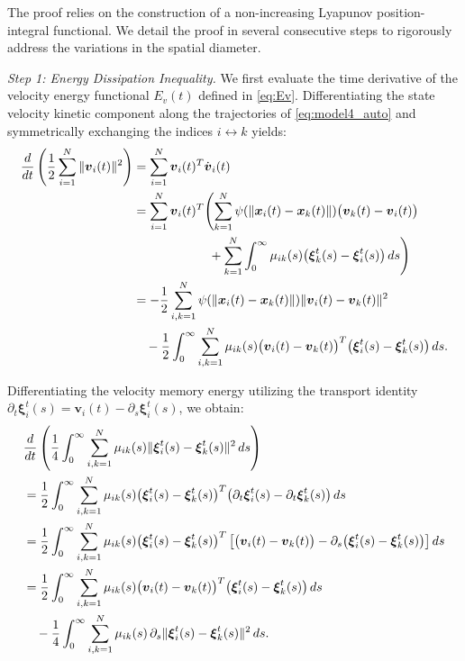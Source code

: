 \documentclass[11pt]{amsart}
\numberwithin{equation}{section}
\begin{document}
 The proof relies on the construction of a non-increasing Lyapunov position-integral functional. We detail the proof in several consecutive steps to rigorously address the variations in the spatial diameter.

\noindent\textit{Step 1: Energy Dissipation Inequality.}
We first evaluate the time derivative of the velocity energy functional $E_v(t)$ defined in \eqref{eq:Ev}. Differentiating the state velocity kinetic component along the trajectories of \eqref{eq:model4_auto} and symmetrically exchanging the indices $i \leftrightarrow k$ yields:
\begin{align}\label{eq:Ev_dot_state}
\frac{d}{dt}\left(\frac12\sum_{i=1}^N\|\boldsymbol{v}_i(t)\|^2\right) &= \sum_{i=1}^N \boldsymbol{v}_i(t)^T \dot{\boldsymbol{v}}_i(t) \notag \\
&= \sum_{i=1}^N \boldsymbol{v}_i(t)^T \Biggl( \sum_{k=1}^{N} \psi(\|\boldsymbol{x}_i(t)-\boldsymbol{x}_k(t)\|)\bigl(\boldsymbol{v}_k(t)-\boldsymbol{v}_i(t)\bigr) \notag \\
&\qquad\qquad\qquad + \sum_{k=1}^{N} \int_0^\infty \mu_{ik}(s)\bigl(\boldsymbol{\xi}_k^t(s)-\boldsymbol{\xi}_i^t(s)\bigr)\,ds \Biggr) \notag \\
&= -\frac12\sum_{i,k=1}^N\psi(\|\boldsymbol{x}_i(t)-\boldsymbol{x}_k(t)\|)\|\boldsymbol{v}_i(t)-\boldsymbol{v}_k(t)\|^2 \notag\\
&\quad -\frac12\int_0^\infty\sum_{i,k=1}^N\mu_{ik}(s)\bigl(\boldsymbol{v}_i(t)-\boldsymbol{v}_k(t)\bigr)^T\bigl(\boldsymbol{\xi}_i^t(s)-\boldsymbol{\xi}_k^t(s)\bigr)\,ds.
\end{align}

Differentiating the velocity memory energy utilizing the transport identity $\partial_t\boldsymbol{\xi}_i^t(s) = \boldsymbol{v}_i(t) - \partial_s\boldsymbol{\xi}_i^t(s)$, we obtain:
\begin{align}\label{eq:Ev_dot_memory}
&\frac{d}{dt}\left(\frac14\int_0^\infty\sum_{i,k=1}^N\mu_{ik}(s)\|\boldsymbol{\xi}_i^t(s)-\boldsymbol{\xi}_k^t(s)\|^2\,ds\right) \notag \\
&= \frac12\int_0^\infty\sum_{i,k=1}^N\mu_{ik}(s)\bigl(\boldsymbol{\xi}_i^t(s)-\boldsymbol{\xi}_k^t(s)\bigr)^T \bigl( \partial_t\boldsymbol{\xi}_i^t(s) - \partial_t\boldsymbol{\xi}_k^t(s) \bigr)\,ds \notag \\
&= \frac12\int_0^\infty\sum_{i,k=1}^N\mu_{ik}(s)\bigl(\boldsymbol{\xi}_i^t(s)-\boldsymbol{\xi}_k^t(s)\bigr)^T \left[ \bigl(\boldsymbol{v}_i(t)-\boldsymbol{v}_k(t)\bigr) - \partial_s\bigl(\boldsymbol{\xi}_i^t(s)-\boldsymbol{\xi}_k^t(s)\bigr) \right] ds \notag \\
&= \frac12\int_0^\infty\sum_{i,k=1}^N\mu_{ik}(s)\bigl(\boldsymbol{v}_i(t)-\boldsymbol{v}_k(t)\bigr)^T\bigl(\boldsymbol{\xi}_i^t(s)-\boldsymbol{\xi}_k^t(s)\bigr)\,ds \notag \\
&\quad - \frac14\int_0^\infty\sum_{i,k=1}^N \mu_{ik}(s)\,\partial_s\|\boldsymbol{\xi}_i^t(s)-\boldsymbol{\xi}_k^t(s)\|^2\,ds.
\end{align}
\end{document}
